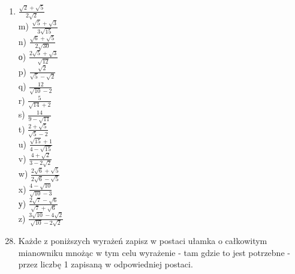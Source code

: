 \documentclass[10pt]{article}
\begin{document}
\begin{enumerate}
  \item \(\frac{\sqrt{2}+\sqrt{5}}{2 \sqrt{2}}\)\\
m) \(\frac{\sqrt{5}+\sqrt{3}}{3 \sqrt{15}}\)\\
n) \(\frac{\sqrt{6}+\sqrt{5}}{2 \sqrt{30}}\)\\
о) \(\frac{2 \sqrt{5}+\sqrt{3}}{\sqrt{12}}\)\\
p) \(\frac{\sqrt{2}}{\sqrt{5}-\sqrt{2}}\)\\
q) \(\frac{12}{\sqrt{10}-2}\)\\
r) \(\frac{5}{\sqrt{14}+2}\)\\
s) \(\frac{14}{9-\sqrt{11}}\)\\
t) \(\frac{2+\sqrt{5}}{\sqrt{5}-2}\)\\
u) \(\frac{\sqrt{15}+1}{4-\sqrt{15}}\)\\
v) \(\frac{4+\sqrt{2}}{3-2 \sqrt{2}}\)\\
w) \(\frac{2 \sqrt{6}+\sqrt{5}}{2 \sqrt{6}-\sqrt{5}}\)\\
x) \(\frac{4-\sqrt{10}}{\sqrt{10}-3}\)\\
у) \(\frac{2 \sqrt{7}-\sqrt{6}}{\sqrt{7}+\sqrt{6}}\)\\
z) \(\frac{3 \sqrt{10}-4 \sqrt{2}}{\sqrt{10}-2 \sqrt{2}}\)
\end{enumerate}

\begin{enumerate}
  \setcounter{enumi}{27}
  \item Każde z poniższych wyrażeń zapisz w postaci ułamka o całkowitym mianowniku mnożąc w tym celu wyrażenie - tam gdzie to jest potrzebne - przez liczbę 1 zapisaną w odpowiedniej postaci.
\end{enumerate}
\end{document}
